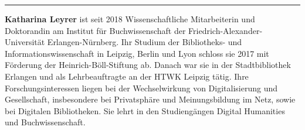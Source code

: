 \begin{center}\rule{0.5\linewidth}{\linethickness}\end{center}

\textbf{Katharina Leyrer} ist seit 2018 Wissenschaftliche Mitarbeiterin und
Doktorandin am Institut für Buchwissenschaft der Friedrich-Alexander-Universität
Erlangen-Nürnberg. Ihr Studium der Bibliotheks- und Informationswissenschaft in
Leipzig, Berlin und Lyon schloss sie 2017 mit Förderung der
Heinrich-Böll-Stiftung ab. Danach war sie in der Stadtbibliothek Erlangen und
als Lehrbeauftragte an der HTWK Leipzig tätig. Ihre Forschungsinteressen liegen
bei der Wechselwirkung von Digitalisierung und Gesellschaft, insbesondere bei
Privatsphäre und Meinungsbildung im Netz, sowie bei Digitalen Bibliotheken. Sie
lehrt in den Studiengängen Digital Humanities und Buchwissenschaft.
